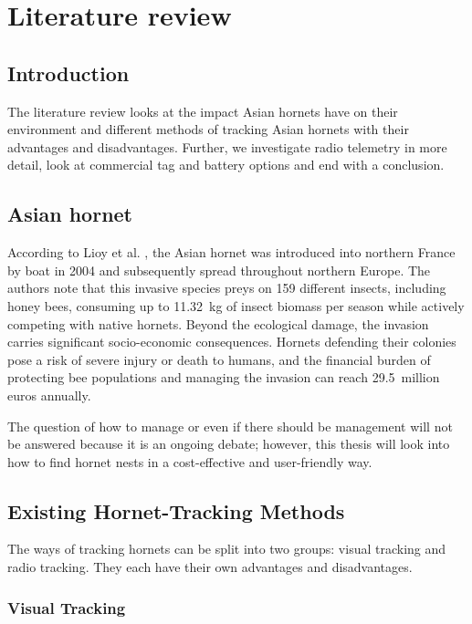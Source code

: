 
\chapter{Literature review}

\section{Introduction}

The literature review looks at the impact Asian hornets have on their environment and different methods of tracking Asian hornets with their advantages and disadvantages. Further, we investigate radio telemetry in more detail, look at commercial tag and battery options and end with a conclusion.

\section{Asian hornet}

According to Lioy et al. \cite{lioyInvasiveHornetVespa2022}, the Asian hornet was introduced into northern France by boat in 2004 and subsequently spread throughout northern Europe. The authors note that this invasive species preys on 159 different insects, including honey bees, consuming up to 11.32~kg of insect biomass per season while actively competing with native hornets. Beyond the ecological damage, the invasion carries significant socio-economic consequences. Hornets defending their colonies pose a risk of severe injury or death to humans, and the financial burden of protecting bee populations and managing the invasion can reach 29.5~million euros annually.

The question of how to manage or even if there should be management will not be answered because it is an ongoing debate; however, this thesis will look into how to find hornet nests in a cost-effective and user-friendly way.

\section{Existing Hornet-Tracking Methods}

The ways of tracking hornets can be split into two groups: visual tracking and radio tracking. They each have their own advantages and disadvantages. 

\subsection{Visual Tracking}

